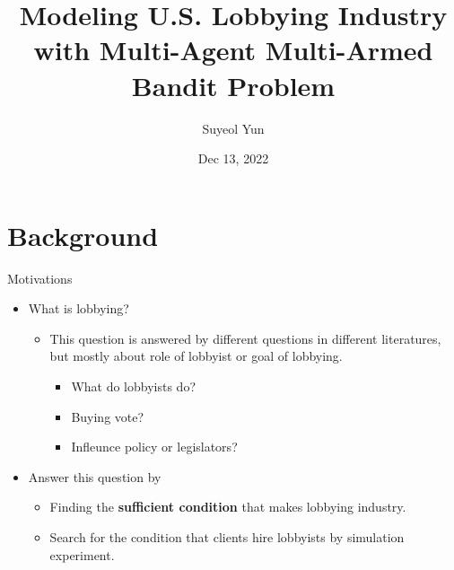 \documentclass{beamer}
\begin{document}
	\title[]{Modeling U.S. Lobbying Industry with Multi-Agent Multi-Armed Bandit Problem}
	\author[Suyeol Yun]{Suyeol Yun}
	\date{Dec 13, 2022}
	\frame{\titlepage}
	\section{Background}

	\begin{frame}{Motivations}
		\begin{itemize}
			\item What is lobbying?
			\begin{itemize}
				\item This question is answered by different questions in different literatures, but mostly about role of lobbyist or goal of lobbying.
				\begin{itemize}
					\item What do lobbyists do? 
					\item Buying vote? 
					\item Infleunce policy or legislators?
				\end{itemize}
			\end{itemize}
		\end{itemize}
		\begin{itemize}
			\item Answer this question by
			\begin{itemize}
				\item Finding the \textbf{sufficient condition} that makes lobbying industry.					
				\item Search for the condition that clients hire lobbyists by simulation experiment.				
			\end{itemize}
		\end{itemize}
	\end{frame}
\end{document}
